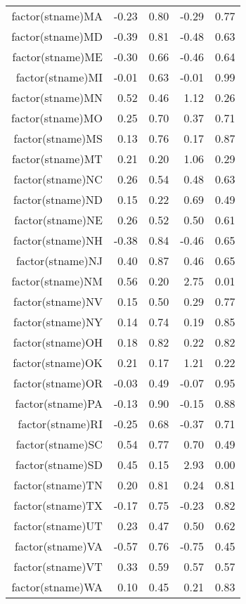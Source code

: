 \begin{table}[ht]
\begin{tabular}{rrrrr}
  factor(stname)MA & -0.23 & 0.80 & -0.29 & 0.77 \\ 
  factor(stname)MD & -0.39 & 0.81 & -0.48 & 0.63 \\ 
  factor(stname)ME & -0.30 & 0.66 & -0.46 & 0.64 \\ 
  factor(stname)MI & -0.01 & 0.63 & -0.01 & 0.99 \\ 
  factor(stname)MN & 0.52 & 0.46 & 1.12 & 0.26 \\ 
  factor(stname)MO & 0.25 & 0.70 & 0.37 & 0.71 \\ 
  factor(stname)MS & 0.13 & 0.76 & 0.17 & 0.87 \\ 
  factor(stname)MT & 0.21 & 0.20 & 1.06 & 0.29 \\ 
  factor(stname)NC & 0.26 & 0.54 & 0.48 & 0.63 \\ 
  factor(stname)ND & 0.15 & 0.22 & 0.69 & 0.49 \\ 
  factor(stname)NE & 0.26 & 0.52 & 0.50 & 0.61 \\ 
  factor(stname)NH & -0.38 & 0.84 & -0.46 & 0.65 \\ 
  factor(stname)NJ & 0.40 & 0.87 & 0.46 & 0.65 \\ 
  factor(stname)NM & 0.56 & 0.20 & 2.75 & 0.01 \\ 
  factor(stname)NV & 0.15 & 0.50 & 0.29 & 0.77 \\ 
  factor(stname)NY & 0.14 & 0.74 & 0.19 & 0.85 \\ 
  factor(stname)OH & 0.18 & 0.82 & 0.22 & 0.82 \\ 
  factor(stname)OK & 0.21 & 0.17 & 1.21 & 0.22 \\ 
  factor(stname)OR & -0.03 & 0.49 & -0.07 & 0.95 \\ 
  factor(stname)PA & -0.13 & 0.90 & -0.15 & 0.88 \\ 
  factor(stname)RI & -0.25 & 0.68 & -0.37 & 0.71 \\ 
  factor(stname)SC & 0.54 & 0.77 & 0.70 & 0.49 \\ 
  factor(stname)SD & 0.45 & 0.15 & 2.93 & 0.00 \\ 
  factor(stname)TN & 0.20 & 0.81 & 0.24 & 0.81 \\ 
  factor(stname)TX & -0.17 & 0.75 & -0.23 & 0.82 \\ 
  factor(stname)UT & 0.23 & 0.47 & 0.50 & 0.62 \\ 
  factor(stname)VA & -0.57 & 0.76 & -0.75 & 0.45 \\ 
  factor(stname)VT & 0.33 & 0.59 & 0.57 & 0.57 \\ 
  factor(stname)WA & 0.10 & 0.45 & 0.21 & 0.83 \\ 

\end{tabular}
\end{table}

